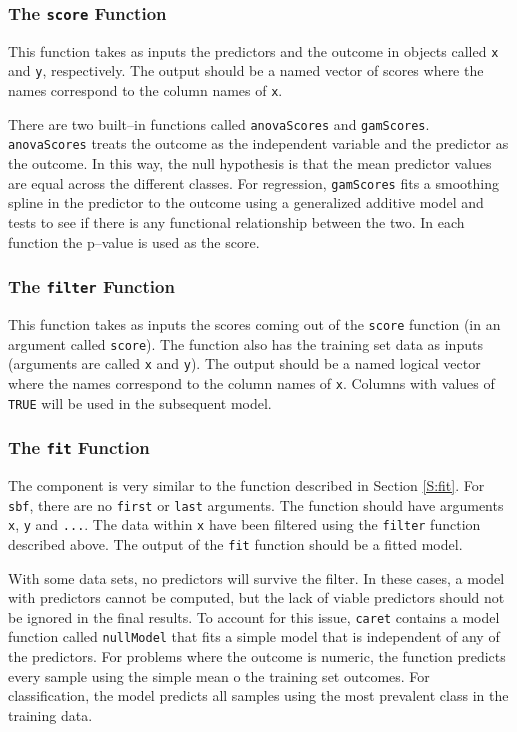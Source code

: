 \documentclass[12pt]{article}
\begin{document}
\subsubsection{The \texttt{score} Function}\label{S:filter}

This function takes as inputs the predictors and the outcome in
objects called \texttt{x} and \texttt{y}, respectively. The output
should be a named vector of scores where the names correspond to the
column names of \texttt{x}. 

There are two built--in functions called \texttt{anovaScores} and
\texttt{gamScores}. \texttt{anovaScores} treats the outcome as the
independent variable and the predictor as the outcome. In this way,
the null hypothesis is that the mean predictor values are equal across
the different classes. For regression, \texttt{gamScores} fits a smoothing spline in
the predictor to the outcome  using a generalized additive model and tests to see if there is any
functional relationship between the two. In each function the
p--value is used as the score.

\subsubsection{The \texttt{filter} Function}\label{S:filter}

This function takes as inputs the scores coming out of the
\texttt{score} function (in an argument called \texttt{score}). The
function also has the training set data as inputs (arguments are called \texttt{x} and \texttt{y}). 
The output
should be a named logical vector where the names correspond to the
column names of \texttt{x}. Columns with values of \texttt{TRUE} will
be used in the subsequent model.


\subsubsection{The \texttt{fit} Function}

The component is very similar to the function described in Section
\ref{S:fit}. For \texttt{sbf}, there are no \texttt{first} or
\texttt{last} arguments. The function should have arguments
\texttt{x}, \texttt{y} and \texttt{...}. The data within \texttt{x}
have been filtered using the \texttt{filter} function described
above. The output of the \texttt{fit} function should be a fitted model.


With some data sets, no predictors will survive the filter. In these cases, a model with predictors cannot be computed, but the lack of viable predictors should not be ignored in the final results. To account for this issue, \texttt{caret} contains a model function called \texttt{nullModel} that fits a simple model that is independent of any of the predictors. For problems where the outcome is numeric, the function predicts every sample using the simple mean o the training set outcomes. For classification, the model predicts all samples using the most prevalent class in the training data.
\end{document}
